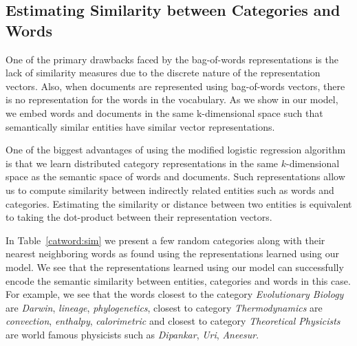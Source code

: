 
\subsection{Estimating Similarity between Categories and Words}
One of the primary drawbacks faced by the bag-of-words representations is the lack of similarity measures due to the discrete nature of the representation vectors. 
Also, when documents are represented using bag-of-words vectors, there is no representation for the words in the vocabulary. 
As we show in our model, we embed words and documents in the same k-dimensional space such that semantically similar entities have similar vector representations. 

One of the biggest advantages of using the modified logistic regression algorithm is that we learn distributed category representations in the same $k$-dimensional space as the semantic space of words and documents. Such representations allow us to compute similarity between indirectly related entities such as words and categories. 
Estimating the similarity or distance between two entities is equivalent to taking the dot-product between their representation vectors.

In Table~\ref{catword:sim} we present a few random categories along with their nearest neighboring words as found using the representations learned using our model. 
We see that the representations learned using our model can successfully encode the semantic similarity between entities, categories and words in this case.
For example, we see that the words closest to the category \emph{Evolutionary Biology} are \emph{Darwin}, \emph{lineage}, \emph{phylogenetics}, closest to category \emph{Thermodynamics} are \emph{convection}, \emph{enthalpy}, \emph{calorimetric} and closest to category \emph{Theoretical Physicists} are world famous physicists such as \emph{Dipankar}, \emph{Uri}, \emph{Aneesur}.

